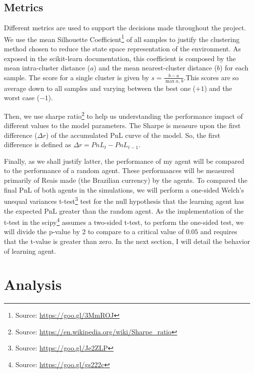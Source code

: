 \documentclass[a4paper]{article}
\begin{document}
\subsection{Metrics}
Different metrics are used to support the decisions made throughout the project. We use the mean Silhouette Coefficient\footnote{Source: \url{https://goo.gl/3MmROJ}} of all samples to justify the clustering method chosen to reduce the state space representation of the environment. As exposed in the scikit-learn documentation, this coefficient is composed by the mean intra-cluster distance ($a$) and the mean nearest-cluster distance ($b$) for each sample. The score for a single cluster is given by $s = \frac{b-a}{\max{a, \, b}}$.This scores are so average down to all samples and varying between the best one ($+ 1$) and the worst case ($-1$).

Then, we use sharpe ratio\footnote{Source: \url{https://en.wikipedia.org/wiki/Sharpe_ratio}} to help us understanding the performance impact of different values to the model parameters. The Sharpe is measure upon the first difference ($\Delta r$) of the accumulated PnL curve of the model. So, the first difference is defined as $\Delta r = PnL_t - PnL_{t-1}$.

Finally, as we shall justify latter, the performance of my agent will be compared to the performance of a random agent. These performances will be measured primarily of Reais made (the Brazilian currency) by the agents. To compared the final PnL of both agents in the simulations, we will perform a one-sided Welch's unequal variances t-test\footnote{Source: \url{https://goo.gl/Je2ZLP}} test for the null hypothesis that the learning agent has the expected PnL greater than the random agent. As the implementation of the t-test in the scipy\footnote{Source: \url{https://goo.gl/gs222c}} assumes a two-sided t-test, to perform the one-sided test, we will divide the p-value by $2$ to compare to a critical value of $0.05$ and requires that the t-value is greater than zero. In the next section, I will detail the behavior of learning agent.


\section{Analysis}
\label{sec:analysis}
\end{document}
